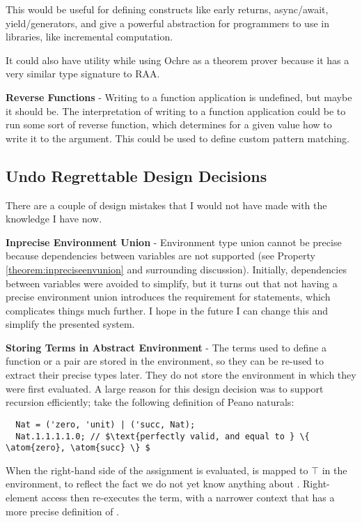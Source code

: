 \documentclass[12pt,twoside]{report}
\begin{document}
This would be useful for defining constructs like early returns, async/await, yield/generators, and give a powerful abstraction for programmers to use in libraries, like incremental computation.

It could also have utility while using Ochre as a theorem prover because it has a very similar type signature to RAA.

\textbf{Reverse Functions} - Writing to a function application is undefined, but maybe it should be. The interpretation of writing to a function application could be to run some sort of reverse function, which determines for a given value how to write it to the argument. This could be used to define custom pattern matching.

\subsection{Undo Regrettable Design Decisions}
There are a couple of design mistakes that I would not have made with the knowledge I have now.

\textbf{Inprecise Environment Union} - Environment type union cannot be precise because dependencies between variables are not supported (see Property \ref{theorem:inpreciseenvunion} and surrounding discussion). Initially, dependencies between variables were avoided to simplify, but it turns out that not having a precise environment union introduces the requirement for statements, which complicates things much further. I hope in the future I can change this and simplify the presented system.

\textbf{Storing Terms in Abstract Environment} - The terms used to define a function or a pair are stored in the environment, so they can be re-used to extract their precise types later. They do not store the environment in which they were first evaluated. A large reason for this design decision was to support recursion efficiently; take the following definition of Peano naturals:

\begin{verbatim}
  Nat = ('zero, 'unit) | ('succ, Nat);
  Nat.1.1.1.1.0; // $\text{perfectly valid, and equal to } \{ \atom{zero}, \atom{succ} \} $
\end{verbatim}

When the right-hand side of the assignment is evaluated,  is mapped to $\top$ in the environment, to reflect the fact we do not yet know anything about . Right-element access then re-executes the  term, with a narrower context that has a more precise definition of .
\end{document}

